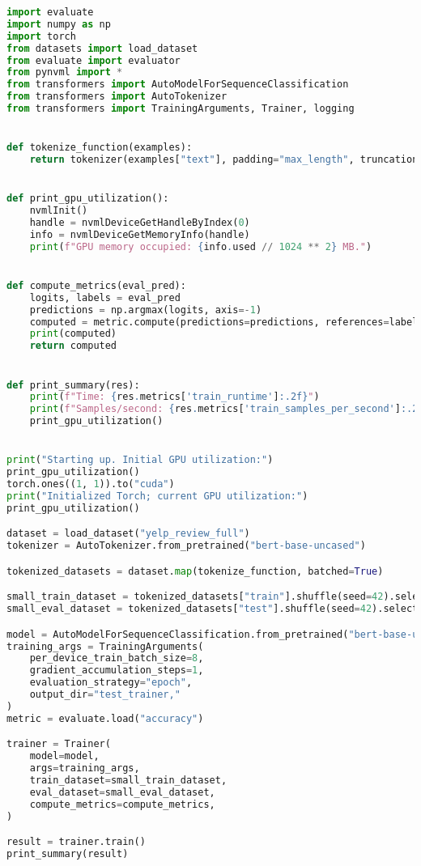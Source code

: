 \begin{lstlisting}[language=python]
import evaluate
import numpy as np
import torch
from datasets import load_dataset
from evaluate import evaluator
from pynvml import *
from transformers import AutoModelForSequenceClassification
from transformers import AutoTokenizer
from transformers import TrainingArguments, Trainer, logging


def tokenize_function(examples):
    return tokenizer(examples["text"], padding="max_length", truncation=True)


def print_gpu_utilization():
    nvmlInit()
    handle = nvmlDeviceGetHandleByIndex(0)
    info = nvmlDeviceGetMemoryInfo(handle)
    print(f"GPU memory occupied: {info.used // 1024 ** 2} MB.")


def compute_metrics(eval_pred):
    logits, labels = eval_pred
    predictions = np.argmax(logits, axis=-1)
    computed = metric.compute(predictions=predictions, references=labels)
    print(computed)
    return computed


def print_summary(res):
    print(f"Time: {res.metrics['train_runtime']:.2f}")
    print(f"Samples/second: {res.metrics['train_samples_per_second']:.2f}")
    print_gpu_utilization()


print("Starting up. Initial GPU utilization:")
print_gpu_utilization()
torch.ones((1, 1)).to("cuda")
print("Initialized Torch; current GPU utilization:")
print_gpu_utilization()

dataset = load_dataset("yelp_review_full")
tokenizer = AutoTokenizer.from_pretrained("bert-base-uncased")

tokenized_datasets = dataset.map(tokenize_function, batched=True)

small_train_dataset = tokenized_datasets["train"].shuffle(seed=42).select(range(1000))
small_eval_dataset = tokenized_datasets["test"].shuffle(seed=42).select(range(1000))

model = AutoModelForSequenceClassification.from_pretrained("bert-base-uncased", num_labels=5)
training_args = TrainingArguments(
    per_device_train_batch_size=8,
    gradient_accumulation_steps=1,
    evaluation_strategy="epoch",
    output_dir="test_trainer,"
)
metric = evaluate.load("accuracy")

trainer = Trainer(
    model=model,
    args=training_args,
    train_dataset=small_train_dataset,
    eval_dataset=small_eval_dataset,
    compute_metrics=compute_metrics,
)

result = trainer.train()
print_summary(result)
\end{lstlisting}


